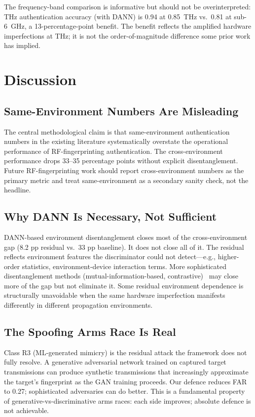 \documentclass[sigconf,nonacm]{acmart}
\begin{document}
The frequency-band comparison is informative but should not be
overinterpreted: THz authentication accuracy (with DANN) is
0.94 at 0.85~THz vs.\ 0.81 at sub-6~GHz, a 13-percentage-point
benefit. The benefit reflects the amplified hardware imperfections
at THz; it is not the order-of-magnitude difference some prior
work has implied.

\section{Discussion}

\subsection{Same-Environment Numbers Are Misleading}

The central methodological claim is that same-environment
authentication numbers in the existing literature systematically
overstate the operational performance of RF-fingerprinting
authentication. The cross-environment performance drops 33--35
percentage points without explicit disentanglement. Future
RF-fingerprinting work should report cross-environment numbers
as the primary metric and treat same-environment as a secondary
sanity check, not the headline.

\subsection{Why DANN Is Necessary, Not Sufficient}

DANN-based environment disentanglement closes most of the
cross-environment gap (8.2 pp residual vs.\ 33 pp baseline). It
does not close all of it. The residual reflects environment
features the discriminator could not detect---e.g., higher-order
statistics, environment-device interaction terms. More
sophisticated disentanglement methods (mutual-information-based,
contrastive)~\cite{tao2024contrastiverff} may close more of
the gap but not eliminate it. Some residual environment dependence
is structurally unavoidable when the same hardware imperfection
manifests differently in different propagation environments.

\subsection{The Spoofing Arms Race Is Real}

Class R3 (ML-generated mimicry) is the residual attack the
framework does not fully resolve. A generative adversarial network
trained on captured target transmissions can produce synthetic
transmissions that increasingly approximate the target's
fingerprint as the GAN training proceeds. Our defence reduces FAR
to 0.27; sophisticated adversaries can do better. This is a
fundamental property of generative-vs-discriminative arms races:
each side improves; absolute defence is not achievable.
\end{document}
